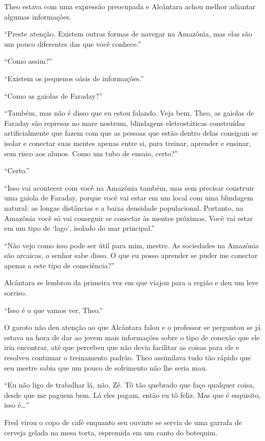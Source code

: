 Theo estava com uma expressão preocupada e Alcântara achou melhor
adiantar algumas informações.

``Preste atenção. Existem outras formas de navegar na Amazônia,
mas elas são um pouco diferentes das que você conhece.''

``Como assim?''

``Existem os pequenos oásis de informações.''

``Como as gaiolas de Faraday?''

``Também, mas não é disso que eu estou falando. Veja bem, Theo, as
gaiolas de Faraday são represas no mare nostrum, blindagens
eletrostáticas construídas artificialmente que fazem com que as pessoas
que estão dentro delas consigam se isolar e conectar suas mentes apenas
entre si, para treinar, aprender e ensinar, sem risco aos alunos. Como
um tubo de ensaio, certo?''

``Certo.''

``Isso vai acontecer com você na Amazônia também, mas sem precisar
construir uma gaiola de Faraday, porque você vai estar em um local com
uma blindagem natural: as longas distâncias e a baixa densidade
populacional. Portanto, na Amazônia você só vai conseguir se conectar às
mentes próximas. Você vai estar em um tipo de `lago', isolado do mar
principal.''

``Não vejo como isso pode ser útil para mim, mestre. As sociedades na
Amazônia são arcaicas, o senhor sabe disso. O que eu posso aprender se
puder me conectar apenas a este tipo de consciência?''

Alcântara se lembrou da primeira vez em que viajou para a região e deu
um leve sorriso.

``Isso é o que vamos ver, Theo.''

O garoto não deu atenção ao que Alcântara falou e o professor se
perguntou se já estava na hora de dar ao jovem mais informações sobre o
tipo de conexão que ele iria encontrar, até que percebeu que não devia
facilitar as coisas para ele e resolveu continuar o treinamento padrão.
Theo assimilava tudo tão rápido que seu mestre sabia que um pouco de
sofrimento não lhe seria mau.

\asterisc

``Eu não ligo de trabalhar lá, não, Zé. Tô tão quebrado que faço
qualquer coisa, desde que me paguem bem. Lá eles pagam, então eu tô
feliz. Mas que é esquisito, isso é\ldots{}''

Fred virou o copo de café enquanto seu ouvinte se servia de uma garrafa
de cerveja gelada na mesa torta, espremida em um canto do botequim.

